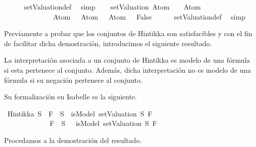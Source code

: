 \begin{isabellebody}
\ \ \ \ \isamarkupfalse%
\ setValuation{\isacharunderscore}def\ \isamarkupfalse%
\ simp\isanewline
\isanewline
\ \ \isamarkupfalse%
\ {\isachardoublequoteopen}{\isacharparenleft}setValuation\ {\isacharbraceleft}Atom\ {}\ \isactrlbold {\isasymor}\ {\isacharparenleft}\isactrlbold {\isasymnot}\ {\isacharparenleft}Atom\ {}{\isacharparenright}{\isacharparenright}{\isacharcomma}\ \isanewline
\ \ \ \ \ \ \ \ \ \ \ \ \isactrlbold {\isasymnot}\ {\isacharparenleft}\isactrlbold {\isasymnot}\ {\isacharparenleft}Atom\ {}{\isacharparenright}{\isacharparenright}{\isacharbraceright}{\isacharparenright}\ {\isasymTurnstile}\ Atom\ {}\ \isactrlbold {\isasymor}\ Atom\ {}\ {\isacharequal}\ False{\isachardoublequoteclose}\isanewline
\ \ \ \ \isamarkupfalse%
\ setValuation{\isacharunderscore}def\ \isamarkupfalse%
\ simp%
\endisatagproof
{\isafoldproof}%
%
\isadelimproof
\isanewline
%
\endisadelimproof
\isanewline
{}\isamarkupfalse%
%
\begin{isamarkuptext}%
Previamente a probar que los conjuntos de Hintikka son 
  satisfacibles y con el fin de facilitar dicha demostración, 
  introducimos el siguiente resultado.

  \begin{lema}
    La interpretación asociada a un conjunto de Hintikka es modelo de
    una fórmula si esta pertenece al conjunto. Además, dicha 
    interpretación no es modelo de una fórmula si su negación 
    pertenece al conjunto.
  \end{lema}

  Su formalización en Isabelle es la siguiente.%
\end{isamarkuptext}\isamarkuptrue%
\isamarkupfalse%
\ {\isachardoublequoteopen}Hintikka\ S\ {\isasymLongrightarrow}\ {\isacharparenleft}F\ {\isasymin}\ S\ {\isasymlongrightarrow}\ isModel\ {\isacharparenleft}setValuation\ S{\isacharparenright}\ F{\isacharparenright}\isanewline
\ \ \ \ \ \ \ \ \ \ \ {\isasymand}\ {\isacharparenleft}\isactrlbold {\isasymnot}\ F\ {\isasymin}\ S\ {\isasymlongrightarrow}\ {\isacharparenleft}{\isasymnot}\ {\isacharparenleft}isModel\ {\isacharparenleft}setValuation\ S{\isacharparenright}\ F{\isacharparenright}{\isacharparenright}{\isacharparenright}{\isachardoublequoteclose}\isanewline
%
\isadelimproof
\ \ %
\endisadelimproof
%
\isatagproof
{}\isamarkupfalse%
%
\endisatagproof
{\isafoldproof}%
%
\isadelimproof
%
\endisadelimproof
%
\begin{isamarkuptext}%
Procedamos a la demostración del resultado.


\end{isamarkuptext}
\end{isabellebody}
